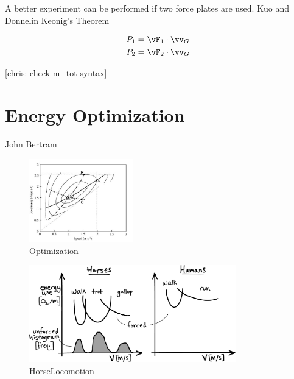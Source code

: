 A better experiment can be performed if two force plates are used. Kuo and Donnelin
Keonig's Theorem

\begin{align}
P_{1} &= \vF_{1} \cdot \vv_{G} \\
P_{2} &= \vF_{2} \cdot \vv_{G}
\end{align}

[chris: check m_{tot} syntax]

\section{Energy Optimization} %
\label{sec:EnergyOptimization}

John Bertram

\begin{figure}[h]		%
\begin{centering}
\includegraphics[width=0.4\textwidth]{Figures/Optimization}\par
\end{centering}
\caption{Optimization}
\label{fig:Optimization}
\end{figure}
%

\begin{figure}[h]		%
\begin{centering}
\includegraphics[width=0.8\textwidth]{Figures/HorseLocomotion}\par
\end{centering}
\caption{HorseLocomotion}
\label{fig:HorseLocomotion}
\end{figure}
%


